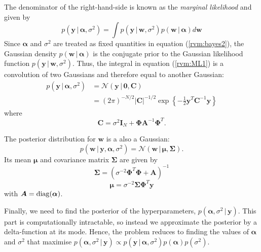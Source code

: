 The denominator of the right-hand-side is known as the \emph{marginal likelihood} and given by
\begin{equation}
  \label{rvm:ML1}
  p(\bm y\,|\,\bm\alpha,\sigma^2) = \int p(\bm y\,|\,\bm w,\sigma^2) p(\bm w\,|\,\bm \alpha) d\bm w
\end{equation}
Since $\bm\alpha$ and $\sigma^2$ are treated as fixed quantities in equation (\ref{rvm:bayes2}), the Gaussian density $p(\bm w\,|\,\bm\alpha)$ is the conjugate prior to the Gaussian likelihood function $p(\bm y\,|\,\bm w,\sigma^2)$.
Thus, the integral in equation (\ref{rvm:ML1}) is a convolution of two Gaussians and therefore equal to another Gaussian:
\begin{equation*}
  \begin{split}
    p(\bm y\,|\,\bm\alpha,\sigma^2) &= \mathcal{N}(\bm y\,|\,\bm 0,\bm C)\\
    &= (2\pi)^{-N/2} |\bm C|^{-1/2} \exp\left\{-\frac{1}{2}\bm y^T \bm C^{-1} \bm y\right\}
  \end{split}
\end{equation*}
where
\begin{equation}
  \label{rvm:C}
  \bm C = \sigma^2 \bm I_N + \bm\Phi\bm A^{-1}\bm\Phi^T.
\end{equation}

The posterior distribution for $\bm w$ is a also a Gaussian:
\begin{equation}
  \label{rvm:posterior}
  p(\bm w\,|\,\bm y,\bm\alpha,\sigma^2) = \mathcal{N}(\bm w\,|\,\bm\mu,\bm\Sigma).
\end{equation}
Its mean $\bm \mu$ and covariance matrix $\bm\Sigma$ are given by
\begin{equation}
  \label{rvm:Sigma}
  \bm\Sigma = \left(\sigma^{-2}\bm\Phi^T\bm\Phi + \bm A\right)^{-1}
\end{equation}
\begin{equation}
  \label{rvm:mu}
  \bm\mu = \sigma^{-2}\bm\Sigma\bm\Phi^T\bm y
\end{equation}
with $\bm A = \operatorname*{diag}(\bm\alpha)$.

Finally, we need to find the posterior of the hyperparameters, $p(\bm\alpha,\sigma^2\,|\,\bm y)$.
This part is computationally intractable, so instead we approximate the posterior by a delta-function at its mode.
Hence, the problem reduces to finding the values of $\bm \alpha$ and $\sigma^2$ that maximise $p(\bm\alpha,\sigma^2\,|\,\bm y) \propto p(\bm y\,|\,\bm\alpha,\sigma^2)p(\bm\alpha)p(\sigma^2)$.

